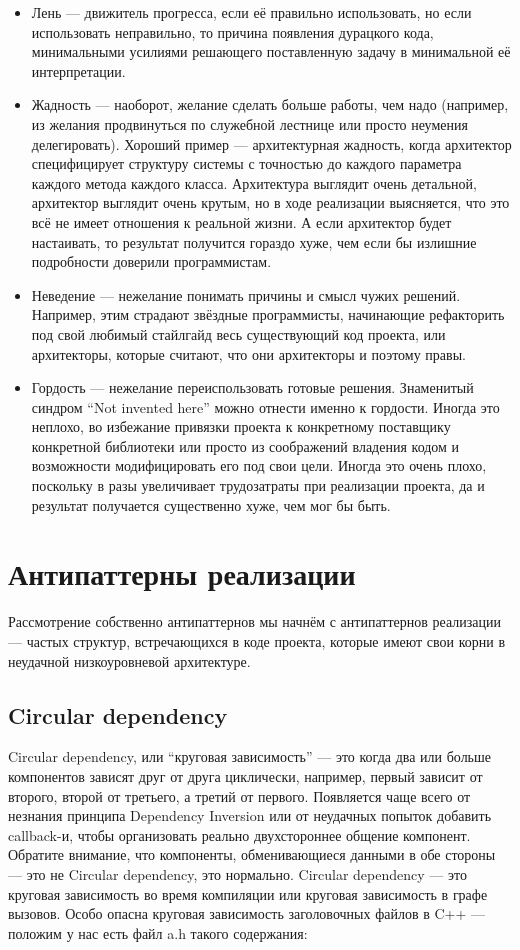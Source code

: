 \documentclass[a5paper]{article}
\begin{document}
\begin{itemize}
    \item Лень --- движитель прогресса, если её правильно использовать, но если использовать неправильно, то причина появления дурацкого кода, минимальными усилиями решающего поставленную задачу в минимальной её интерпретации.
    \item Жадность --- наоборот, желание сделать больше работы, чем надо (например, из желания продвинуться по служебной лестнице или просто неумения делегировать). Хороший пример --- архитектурная жадность, когда архитектор специфицирует структуру системы с точностью до каждого параметра каждого метода каждого класса. Архитектура выглядит очень детальной, архитектор выглядит очень крутым, но в ходе реализации выясняется, что это всё не имеет отношения к реальной жизни. А если архитектор будет настаивать, то результат получится гораздо хуже, чем если бы излишние подробности доверили программистам.
    \item Неведение --- нежелание понимать причины и смысл чужих решений. Например, этим страдают звёздные программисты, начинающие рефакторить под свой любимый стайлгайд весь существующий код проекта, или архитекторы, которые считают, что они архитекторы и поэтому правы.
    \item Гордость --- нежелание переиспользовать готовые решения. Знаменитый синдром ``Not invented here'' можно отнести именно к гордости. Иногда это неплохо, во избежание привязки проекта к конкретному поставщику конкретной библиотеки или просто из соображений владения кодом и возможности модифицировать его под свои цели. Иногда это очень плохо, поскольку в разы увеличивает трудозатраты при реализации проекта, да и результат получается существенно хуже, чем мог бы быть.
\end{itemize}

\section{Антипаттерны реализации}

Рассмотрение собственно антипаттернов мы начнём с антипаттернов реализации --- частых структур, встречающихся в коде проекта, которые имеют свои корни в неудачной низкоуровневой архитектуре.

\subsection{Circular dependency}

Circular dependency, или ``круговая зависимость'' --- это когда два или больше компонентов зависят друг от друга циклически, например, первый зависит от второго, второй от третьего, а третий от первого. Появляется чаще всего от незнания принципа Dependency Inversion или от неудачных попыток добавить callback-и, чтобы организовать реально двухстороннее общение компонент. Обратите внимание, что компоненты, обменивающиеся данными в обе стороны --- это не Circular dependency, это нормально. Circular dependency --- это круговая зависимость во время компиляции или круговая зависимость в графе вызовов. Особо опасна круговая зависимость заголовочных файлов в C++ --- положим у нас есть файл a.h такого содержания:
\end{document}
